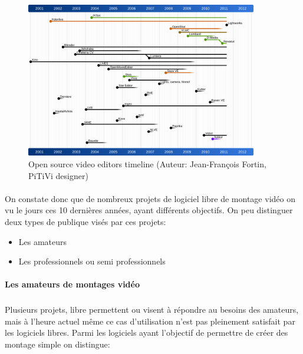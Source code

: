 \begin{figure} [h]
  \begin{center}
    \includegraphics[width=0.9\textwidth]{images/open-source-video-editor-timeline}
  \end{center} \caption{Open source video editors timeline (Auteur:
  Jean-François Fortin, PiTiVi designer)} \label{Yes}
\end{figure}

\paragraph{ }

On constate donc que de nombreux projets de logiciel libre de montage
vidéo on vu le jours ces 10 dernières années, ayant différents
objectifs.  On peu distinguer deux types de publique visés par ces
projets:

\begin {itemize}

  \item {Les amateurs}

  \item {Les professionnels ou semi professionnels}
\end {itemize}

\paragraph {Les amateurs de montages vidéo}

\subparagraph{}

Plusieurs projets, libre permettent ou visent à répondre au besoins
des amateurs, mais à l'heure actuel même ce cas d'utilisation n'est
pas pleinement satisfait par les logiciels libres. Parmi les logiciels
ayant l'objectif de permettre de créer des montage simple on distingue:

